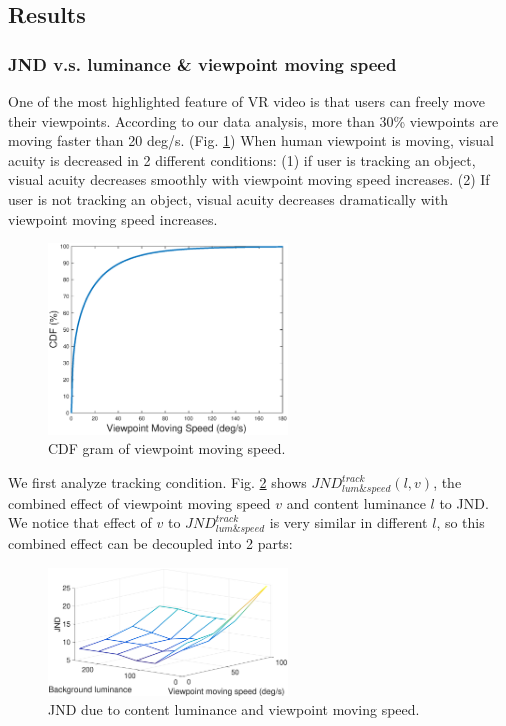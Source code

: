 \subsection{Results}

\subsubsection{JND v.s. luminance \& viewpoint moving speed}

One of the most highlighted feature of VR video is that users can freely move their viewpoints. According to our data analysis, more than 30\% viewpoints are moving faster than 20 deg/s. (Fig. \ref{CDFspeed}) When human viewpoint is moving, visual acuity is decreased in 2 different conditions: (1) if user is tracking an object, visual acuity decreases smoothly with viewpoint moving speed increases. (2) If user is not tracking an object, visual acuity decreases dramatically with viewpoint moving speed increases. \cite{speed}

\begin{figure}
  \centering
  \includegraphics[width=2.5in]{images/speed_CDF.eps}
  \caption{CDF gram of viewpoint moving speed.}
  \label{CDFspeed}
  \end{figure}
  
We first analyze tracking condition. Fig. \ref{JNDspeed-lum-track} shows $JND_{lum\&speed}^{track}(l, v)$, the combined effect of viewpoint moving speed $v$ and content luminance $l$ to JND. We notice that effect of $v$ to $JND_{lum\&speed}^{track}$ is very similar in different $l$, so this combined effect can be decoupled into 2 parts:

\begin{figure}
  \centering
  \includegraphics[width=2.5in]{images/JNDspeed-lum.eps}
  \caption{JND due to content luminance and viewpoint moving speed.}
  \label{JNDspeed-lum-track}
  \end{figure}

